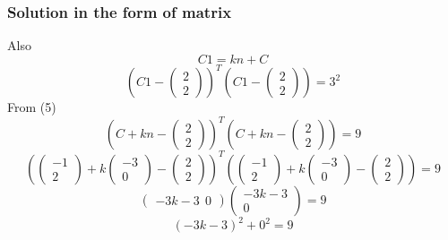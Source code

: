 \documentclass{beamer}
\begin{document}
\begin{frame}
\frametitle{Solution in the form of matrix}
Also \begin{equation}C1 = kn + C \end{equation}
$$(C1-\begin{pmatrix}2\\ 2 \end{pmatrix})^T(C1-\begin{pmatrix}2\\ 2 \end{pmatrix}) = 3^2 $$
From (5) $$ ( C + kn - \begin{pmatrix}2\\ 2 \end{pmatrix})^T( C + kn - \begin{pmatrix}2\\ 2 \end{pmatrix}) = 9 $$
$$( \begin{pmatrix}-1\\ 2 \end{pmatrix} + k \begin{pmatrix}-3\\ 0 \end{pmatrix} - \begin{pmatrix}2\\ 2 \end{pmatrix})^T(\begin{pmatrix}-1\\ 2 \end{pmatrix} + k \begin{pmatrix}-3\\ 0 \end{pmatrix} - \begin{pmatrix}2\\ 2 \end{pmatrix}) = 9 $$
$$ \begin{pmatrix}-3k - 3 \ \ 0 \end{pmatrix} \begin{pmatrix}-3k - 3 \\ 0 \end{pmatrix} = 9 $$
$$ ( -3k - 3 )^ 2 + 0^2 = 9 $$
\end{frame}
\end{document}
